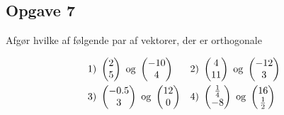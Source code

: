 \subsection*{Opgave 7}

Afgør hvilke af følgende par af vektorer, der er orthogonale

\begin{align*}
	&1) \ \begin{pmatrix}
		2 \\ 5
	\end{pmatrix} 
	\textnormal{ og }
	\begin{pmatrix}
		-10 \\ 4
	\end{pmatrix} 
	&
	&2) \ \begin{pmatrix}
		4 \\ 11
	\end{pmatrix} 
	\textnormal{ og }
	\begin{pmatrix}
		-12 \\ 3
	\end{pmatrix} 
	\\
	&3) \ \begin{pmatrix}
		-0.5 \\ 3
	\end{pmatrix} 
	\textnormal{ og }
	\begin{pmatrix}
		12 \\ 0
	\end{pmatrix} 
	&
	&4) \ \begin{pmatrix}
		\frac{1}{4} \\ -8
	\end{pmatrix} 
	\textnormal{ og }
	\begin{pmatrix}
		16 \\ \frac{1}{2}
	\end{pmatrix} 
\end{align*}

